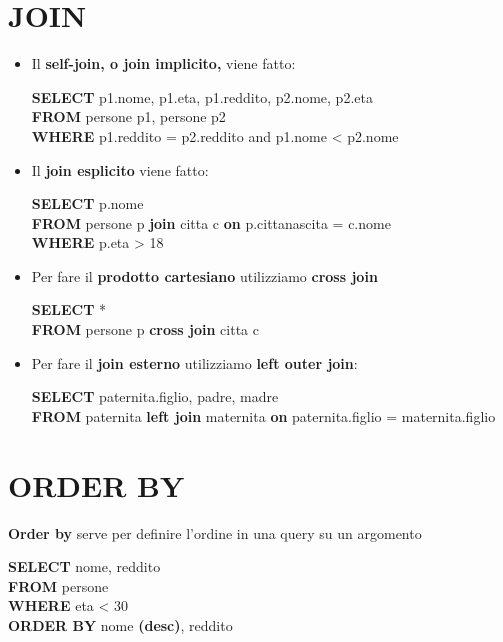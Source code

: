 \documentclass[12pt, a4paper]{article}
\begin{document}
\begin{frame}
		\section{JOIN}
			\begin{itemize} 
		
			\item Il \textbf{self-join, o join implicito,} viene fatto: 
				\begin{center}
				\justifying
				\textbf{SELECT} p1.nome, p1.eta, p1.reddito, p2.nome,  p2.eta \\
	 			\textbf{FROM} persone p1,  persone p2 \\
				\textbf{WHERE} p1.reddito = p2.reddito and p1.nome < p2.nome \\
				\end{center} 
				
			\item Il \textbf{join esplicito} viene fatto: 
				\begin{center}
				\justifying
				\textbf{SELECT} p.nome \\
	 			\textbf{FROM} persone p \textbf{join} citta c \textbf{on} p.cittanascita = c.nome \\
				\textbf{WHERE} p.eta > 18 \\
				\end{center} 
				
			\item Per fare il \textbf{prodotto cartesiano} utilizziamo \textbf{cross join}
				\begin{center}
				\justifying
				\textbf{SELECT} *\\
	 			\textbf{FROM} persone p \textbf{cross join} citta c 
				\end{center} 
			\item Per fare il \textbf{join esterno} utilizziamo \textbf{left outer join}:
				\begin{center}
				\justifying
				\textbf{SELECT} paternita.figlio, padre, madre\\
	 			\textbf{FROM} paternita \textbf{left join} maternita \textbf{on} paternita.figlio = maternita.figlio
				\end{center} 

			\end{itemize}	
		
		\section{ORDER BY}
			\textbf{Order by} serve per definire l'ordine in una query su un argomento
				\begin{center}
				\justifying
				\textbf{SELECT} nome, reddito\\
	 			\textbf{FROM} persone  \\
				\textbf{WHERE} eta < 30 \\
				\textbf{ORDER BY} nome \textbf{(desc)}, reddito
				\end{center} 
		

\end{frame}
\end{document}
